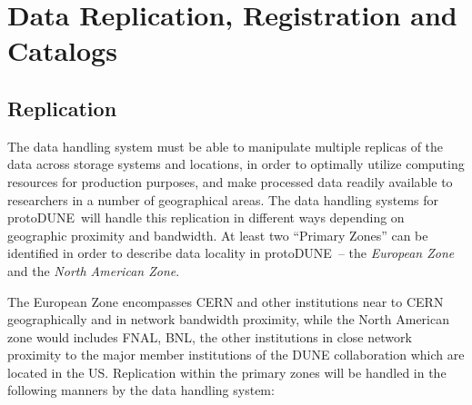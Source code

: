 \documentclass[pdftex,12pt,letter]{article}
\newcommand{\pd}{protoDUNE\ }
\begin{document}
\section{Data Replication, Registration and Catalogs}
\subsection{Replication}

The data handling system must be able to manipulate multiple replicas of the data across storage systems and locations, in order
to optimally utilize computing resources for production purposes, and make processed data readily available to researchers in
a number of geographical areas.
The data handling systems for \pd will handle this replication in different ways
depending on geographic proximity and bandwidth.  At least two ``Primary Zones'' can be identified in order
to describe data locality in \pd -- the \textit{European Zone} and the \textit{North American Zone}.

The European Zone encompasses CERN and other institutions near to CERN geographically and in network bandwidth proximity,
while the North American zone would includes  FNAL, BNL, the other institutions
in close network proximity to the major member institutions of the DUNE collaboration which are located in the US.
Replication within the primary zones will be handled in the following manners by the data handling system:
\end{document}
